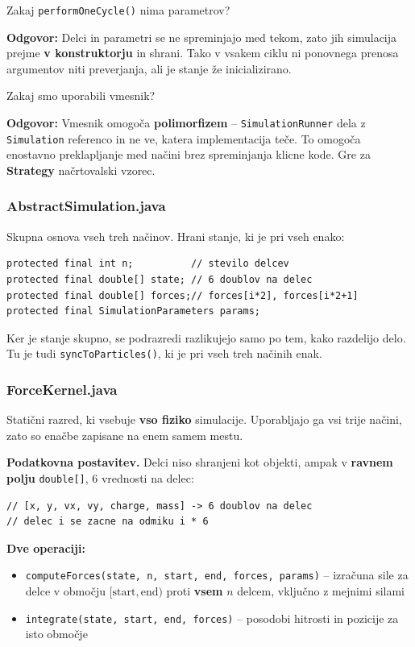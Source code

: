 \documentclass[12pt,a4paper]{article}
\begin{document}
\begin{vprasanje}
Zakaj \texttt{performOneCycle()} nima parametrov?

\textbf{Odgovor:} Delci in parametri se ne spreminjajo med tekom, zato jih simulacija prejme \textbf{v konstruktorju} in shrani. Tako v vsakem ciklu ni ponovnega prenosa argumentov niti preverjanja, ali je stanje \v{z}e inicializirano.
\end{vprasanje}

\begin{vprasanje}
Zakaj smo uporabili vmesnik?

\textbf{Odgovor:} Vmesnik omogo\v{c}a \textbf{polimorfizem} -- \texttt{SimulationRunner} dela z \texttt{Simulation} referenco in ne ve, katera implementacija te\v{c}e. To omogo\v{c}a enostavno preklapljanje med na\v{c}ini brez spreminjanja klicne kode. Gre za \textbf{Strategy} na\v{c}rtovalski vzorec.
\end{vprasanje}

\subsubsection{AbstractSimulation.java}
Skupna osnova vseh treh na\v{c}inov. Hrani stanje, ki je pri vseh enako:
\begin{lstlisting}
protected final int n;          // stevilo delcev
protected final double[] state; // 6 doublov na delec
protected final double[] forces;// forces[i*2], forces[i*2+1]
protected final SimulationParameters params;
\end{lstlisting}
Ker je stanje skupno, se podrazredi razlikujejo samo po tem, kako razdelijo delo. Tu je tudi \texttt{syncToParticles()}, ki je pri vseh treh na\v{c}inih enak.

\subsubsection{ForceKernel.java}
Stati\v{c}ni razred, ki vsebuje \textbf{vso fiziko} simulacije. Uporabljajo ga vsi trije na\v{c}ini, zato so ena\v{c}be zapisane na enem samem mestu.

\textbf{Podatkovna postavitev.} Delci niso shranjeni kot objekti, ampak v \textbf{ravnem polju} \texttt{double[]}, 6 vrednosti na delec:
\begin{lstlisting}
// [x, y, vx, vy, charge, mass] -> 6 doublov na delec
// delec i se zacne na odmiku i * 6
\end{lstlisting}

\textbf{Dve operaciji:}
\begin{itemize}
    \item \texttt{computeForces(state, n, start, end, forces, params)} -- izra\v{c}una sile za delce v obmo\v{c}ju $[\text{start}, \text{end})$ proti \textbf{vsem} $n$ delcem, vklju\v{c}no z mejnimi silami
    \item \texttt{integrate(state, start, end, forces)} -- posodobi hitrosti in pozicije za isto obmo\v{c}je
\end{itemize}
\end{document}
